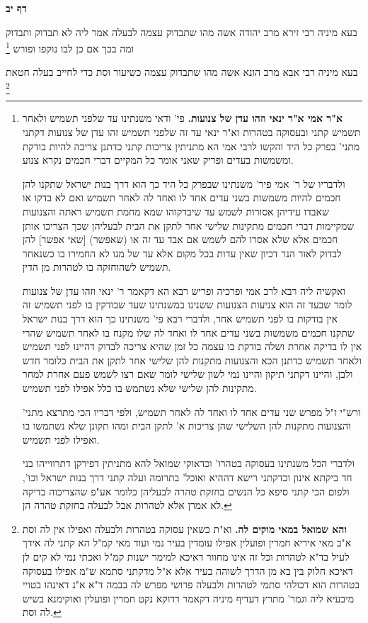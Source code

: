 \documentclass[12pt, openany]{book}
\newcommand{\sethebfont}{
\fontsize{10.5pt}{21.0pt} \selectfont
}
\newcommand{\twocol}[1]{
	{\sethebfont \begin{multicols}{2}
			#1
	\end{multicols}}	
}
\newcommand{\sectname}{}
\newcommand{\newsection}[1]{
	\addcontentsline{toc}{section}{#1}
	\renewcommand{\sectname}{#1}	
	\vspace{-\baselineskip}
	\begin{center}
		\textbf{%
\fontsize{16pt}{16pt}\selectfont
			#1}
	\end{center}
	\vspace{-\baselineskip}
	\nopagebreak
}
\newcommand{\footnotecomment}[1]{\footnote{#1}}
\newcommand{\commenta}[1]{\footnotecomment{#1}}
\begin{document}
\newsection{דף יב}
\twocol{בעא מיניה רבי זירא מרב יהודה  אשה מהו שתבדוק עצמה לבעלה  אמר ליה  לא תבדוק  ותבדוק ומה בכך  אם כן לבו נוקפו ופורש 
\commenta{\textbf{א"ר אמי א"ר ינאי וזהו עדן של צנועות.}  פי' ודאי משנתינו עד שלפני תשמיש ולאחר תשמיש קתני ובעסוקה בטהרות וא"ר ינאי עד זה שלפני תשמיש זהו עדן של צנועות דקתני מתני' בפרק כל היד והקשו לרבי אמי הא מתניתין צריכות קתני כדתנן צריכה להיות בודקת ומשמשות בעדים ופריק שאני אומר כל המקיים דברי חכמים נקרא צנוע.\par  ולדבריו של ר' אמי פיר' משנתינו שבפרק כל היד כך הוא דרך בנות ישראל שתקנו להן חכמים להיות משמשות בשני עדים אחד לו ואחד לה לאחר תשמיש ואם לא בדקו או שאבדו עידיהן אסורות לשמש עד שיבדקוהו שמא מחמת תשמיש ראתה והצנועות שמקיימות דברי חכמים מתקינות שלישי אחר לתקן את הבית לבעליהן שכך הצריכו אותן חכמים אלא שלא אסרו להם לשמש אם אבד עד זה או (שאפשר) [שאי אפשר] להן לבדוק לאור הנר דכיון שאין עדות בכל מקום אלא עד של מגו לא החמירו בו כשנאחר תשמיש לשהוחזקה בו לטהרות מן הדין.\par  ואקשיה ליה רבא לרב אמי ופרכיה ופריש רבא הא דקאמר ר' ינאי וזהו עדן של צנועות לומר שבעד זה הוא צניעות הצנועות ששנינו במשנתינו שעד שבודקין בו לפני תשמיש זה אין בודקות בו לפני תשמיש אחר, ולדברי רבא פי' משנתינו כך הוא דרך בנות ישראל שתקנו חכמים משמשות בשני עדים אחד לו ואחד לה שלו מקנח בו לאחר תשמיש שהרי אין לו בדיקה אחרת ושלה בודקת בו עצמה כל זמן שהיא צריכה לבדוק דהיינו לפני תשמיש ולאחר תשמיש כדתנן הכא והצנועות מתקנות להן שלישי אחר לתקן את הבית כלומר חדש ולבן, והיינו דקתני תיקון והיינו נמי לשון שלישי לומר שאם רצו לשמש פעם אחרת למחר מתקינות להן שלישי שלא נשתמש בו כלל אפילו לפני תשמיש.\par  ורש"י ז"ל מפרש שני עדים אחד לו ואחד לה לאחר תשמיש, ולפי דבריו הכי מתרצא מתני' והצנועות מתקנות להן השלישי שהן צריכות א' לתקן הבית ומהו תקונן שלא נשתמשו בו ואפילו לפני תשמיש.\par  ולדברי הכל משנתינו בעסוקה בטהרו' וכדאוקי שמואל להא מתניתין דפירקן דתרווייהו בני חד ביקתא אינון וכדקתני רישא דההיא ואוכל' בתרומה ועלה קתני דרך בנות ישראל וכו', ולפום הכי קתני סיפא כל הנשים בחזקת טהרה לבעליהן כלומר אע"פ שהצריכוה בדיקה לא אמרן אלא לטהרות אבל לבעלה בחזקת טהרה הן. }

בעא מיניה רבי אבא מרב הונא  אשה מהו שתבדוק עצמה כשיעור וסת כדי לחייב בעלה חטאת 
\commenta{\textbf{והא שמואל במאי מוקים לה.}  וא"ת כשאין עסוקה בטהרות ולבעלה ואפילו אין לה וסת א"ב מאי איריא חמרין ופועלין אפילו עומדין בעיר נמי ועוד מאי קמ"ל הא קתני לה אידך לעיל בד"א לטהרות וכל זה אינו מחוור דאיכא למימר ישנות קמ"ל ואכתי נמי לא קים לן דאיכא חלוק בין בא מן הדרך לשוהה בעיר אלא א"ל מדקתני סתמא ש"מ אפילו בעסוקה בטהרות הוא דכולהי סתמי לטהרות ולבעלה פרושי מפרש לה בבמה ד"א א"נ דאינהו בטויי מיבעיא ליה וגמר' מתרץ דעדיף מיניה דקאמר דדוקא נקט חמרין ופועלין ואוקימנא בשיש לה וסת. }

}
\end{document}
